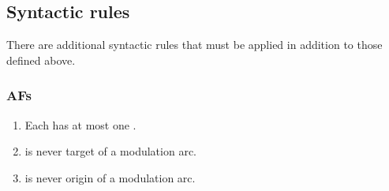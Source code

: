 \subsection{Syntactic rules}

There are additional syntactic rules that must be applied in addition to those defined above.

\subsubsection{AFs}

 \begin{enumerate}
    \item Each  has at most one .
    \item {} is never target of a modulation arc.
    \item {} is never origin of a modulation arc.
 \end{enumerate}



